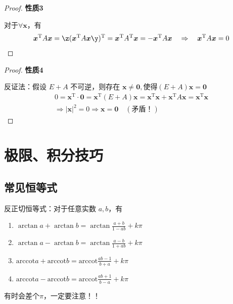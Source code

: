 \begin{proof}\textcolor{myblue}{\textbf{性质3}}

对于$\forall \boldsymbol{x} $，有 
\[ \boldsymbol{x}^\mathrm{T} A \boldsymbol{x} = \z( \boldsymbol{x}^\mathrm{T} A \boldsymbol{x}  \y)^{\mathrm{T}} = \boldsymbol{x}^\mathrm{T} A^\mathrm{T} \boldsymbol{x}=
-  \boldsymbol{x}^\mathrm{T} A \boldsymbol{x}\quad \Rightarrow\quad
\boldsymbol{x} ^\mathrm{T} A \boldsymbol{x} = 0 \] 
\end{proof}

\begin{proof}\textcolor{myblue}{\textbf{性质4}}

反证法：假设 $E+A$ 不可逆，则存在 $\boldsymbol{x} \neq \boldsymbol{0} ,\text{使得}(E+A)\boldsymbol{x} = \boldsymbol{0}$
\begin{gather*}
0 = \boldsymbol{x}^\mathrm{T} \cdot \boldsymbol{0} = \boldsymbol{x}^\mathrm{T}(E+A)\boldsymbol{x} = \boldsymbol{x}^\mathrm{T}\boldsymbol{x} + \boldsymbol{x}^\mathrm{T}A\boldsymbol{x} = \boldsymbol{x}^\mathrm{T}\boldsymbol{x} \\
\Rightarrow |\boldsymbol{x}|^2 = 0 \Rightarrow \boldsymbol{x} = \boldsymbol{0} \quad (\text{矛盾！})
\end{gather*}

\end{proof}






\chapter{极限、积分技巧}

\section{常见恒等式}
\begin{lemma}
反正切恒等式：对于任意实数 \(a,b\)，有
\begin{enumerate}
\item \(\arctan a + \arctan b = \arctan \frac{a+b}{1-ab} + k\pi\)
\item \(\arctan a - \arctan b = \arctan \frac{a-b}{1+ab} + k\pi \)
\item $ \text{arccot} a +  \text{arccot} b =  \text{arccot} \frac{ab-1}{b+a} + k\pi $
\item $  \text{arccot} a - \text{arccot} b =  \text{arccot} \frac{ab+1}{b-a} + k\pi $
\end{enumerate}
有时会差个\(\pi\)，一定要注意！！
\end{lemma}

